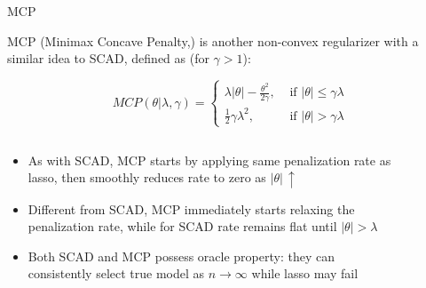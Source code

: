 \documentclass[11pt,compress,t,notes=noshow, xcolor=table]{beamer}
\begin{document}
\begin{vbframe}{MCP}

MCP ({\footnotesize{Minimax Concave Penalty},}) is another non-convex regularizer with a similar idea to SCAD, defined as (for $\gamma>1$):

$$
MCP(\theta | \lambda, \gamma)= \begin{cases}\lambda|\theta|-\frac{\theta^2}{2 \gamma}, & \text { if }|\theta| \leq \gamma \lambda \\ \frac{1}{2} \gamma \lambda^2, & \text { if }|\theta|>\gamma \lambda\end{cases}
$$

\begin{columns}

\begin{column}{0.4\textwidth}

{\scriptsize
\begin{itemize}\setlength{\itemsep}{1.0em}
    \item As with SCAD, MCP starts by applying same penalization rate as lasso, then smoothly reduces rate to zero as $|\theta|\,\uparrow$
    \item Different from SCAD, MCP immediately starts relaxing the penalization rate, while for SCAD rate remains flat until $|\theta|>\lambda$
    \item Both SCAD and MCP possess oracle property: they can consistently select true model as $n \to \infty$ while lasso may fail
\end{itemize}
}
\end{column}

\begin{column}{0.6\textwidth}

\begin{figure}
      \centering
    \end{figure}

\end{column}

\end{columns}


\end{vbframe}
\end{document}
